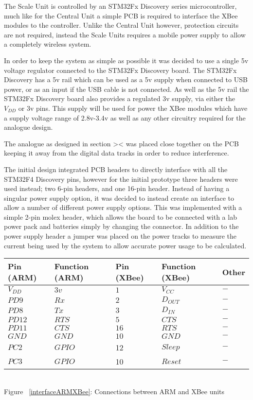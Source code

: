 The Scale Unit is controlled by an STM32Fx Discovery series microcontroller, much like for the Central Unit a simple PCB is required to interface the XBee modules to the controller.  Unlike the Central Unit however, protection circuits are not required, instead the Scale Units requires a mobile power supply to allow a completely wireless system.

In order to keep the system as simple as possible it was decided to use a single 5v voltage regulator connected to the STM32Fx Discovery board. The STM32Fx Discovery has a 5v rail which can be used as a 5v supply when connected to USB power, or as an input if the USB cable is not connected. As well as the 5v rail the STM32Fx Discovery board also provides a regulated 3v supply, via either the $V_{DD}$ or 3v pins. This supply will be used for power the XBee modules which have a supply voltage range of 2.8v-3.4v as well as any other circuitry required for the analogue design.

The analogue as designed in section >< was placed close together on the PCB keeping it away from the digital data tracks in order to reduce interference.

The initial design integrated PCB headers to directly interface with all the STM32F4 Discovery pins, however for the initial prototype three headers were used instead; two 6-pin headers, and one 16-pin header. Instead of having a singular power supply option, it was decided to instead create an interface to allow a number of different power supply options. This was implemented with a simple 2-pin molex header, which allows the board to be connected with a lab power pack and batteries simply by changing the connector. In addition to the power supply header a jumper was placed on the power tracks to measure the current being used by the system to allow accurate power usage to be calculated.

\begin{center}
  \begin{tabular}{| l | l | l | l | l |}
    \hline
    \bf{Pin (ARM)} & \bf{Function (ARM)} & \bf{Pin (XBee)} & \bf{Function (XBee)}  & \bf{Other}\\ \hline
         $V_{DD}$ & $3v $& $1 $& $V_{CC} $& $ - $\\ \hline
	 $PD9$ & \(Rx\) &$ 2$ &$ D_{OUT}$ &$ - $\\ \hline
	 $PD8 $& \(Tx\) &$ 3$ &$ D_{IN}$ & $- $\\ \hline
	 $PD12$ & \(RTS\) & $5$ & $CTS$ &$ - $ \\ \hline
	 $PD11$ & $CTS$ & $16$ & $RTS$ & $-$ \\ \hline
	 $GND$ & \(GND\) & $10$ & \(GND\) & $-$\\ \hline
	$PC2 $ & \(GPIO\) & 12 & \(Sleep\) & $-$\\ \hline
	$PC3 $ & \(GPIO\) & 10 & \(Reset\) & $-$ \\
    \hline
  \end{tabular}
\label{interfaceARMXBee}\\
Figure ~\ref{interfaceARMXBee}: Connections between ARM and XBee units
\end{center}
